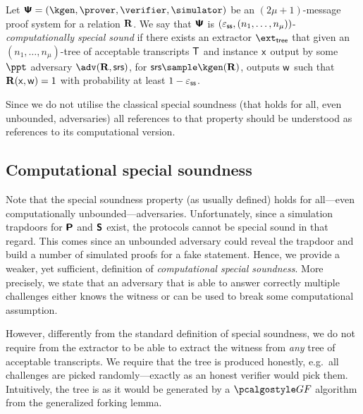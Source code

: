 \documentclass[runningheads,11pt]{llncs}
\begin{document}
\begin{definition}
  Let $\proofsystem = (\kgen, \prover, \verifier, \simulator)$ be an
  $(2 \mu + 1)$-message proof system for a relation $\mathbf{R}$. We say that
  $\bm{\mathsf{\Psi}}$ is $(\varepsilon_{\mathsf{ss}}, (n_1, \ldots, n_\mu))$-\emph{computationally special sound}
  if there exists an extractor $\extt$ that given an $(n_1, \ldots, n_\mu)$-tree
  of acceptable transcripts $\mathsf{T}$ and instance $\mathsf{x}$ output by some $\ppt$ adversary $\adv(\REL,
  \srs)$, for $\srs \sample \kgen(\REL)$, outputs $\mathsf{w}$ such that $\mathbf{R}(\mathsf{x},
  \mathsf{w}) = 1$ with probability at least $1 - \varepsilon_{\mathsf{ss}}$.
\end{definition}

Since we do not utilise the classical special soundness (that holds for all,
even unbounded, adversaries) all references to that property should be
understood as references to its computational version.
\fi

\subsection{Computational special soundness}
Note that the special soundness property (as usually defined) holds for
all---even computationally unbounded---adversaries. Unfortunately, since a
simulation trapdoors for $\bm{\mathsf{P}}$ and $\bm{\mathsf{S}}$ exist, the protocols
cannot be special sound in that regard. This comes since an unbounded adversary
could reveal the trapdoor and build a number of simulated proofs for a fake
statement. Hence, we provide a weaker, yet sufficient, definition of
\emph{computational special soundness}. More precisely, we state that an
adversary that is able to answer correctly multiple challenges either knows the
witness or can be used to break some computational assumption.

However, differently from the standard definition of special soundness, we do
not require from the extractor to be able to extract the witness from \emph{any}
tree of acceptable transcripts. We require that the tree is produced honestly,
e.g.~all challenges are picked randomly---exactly as an honest verifier would
pick them. Intuitively, the tree is as it would be generated by a $\genforking$
algorithm from the generalized forking lemma.
\end{document}
